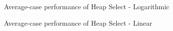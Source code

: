 \documentclass{article}
\begin{document}
\begin{figure}[H]   
  \caption{Average-case performance of Heap Select - Logarithmic}
\end{figure} 

\begin{figure}[H]   
  \caption{Average-case performance of Heap Select - Linear}
\end{figure} 
\end{document}
